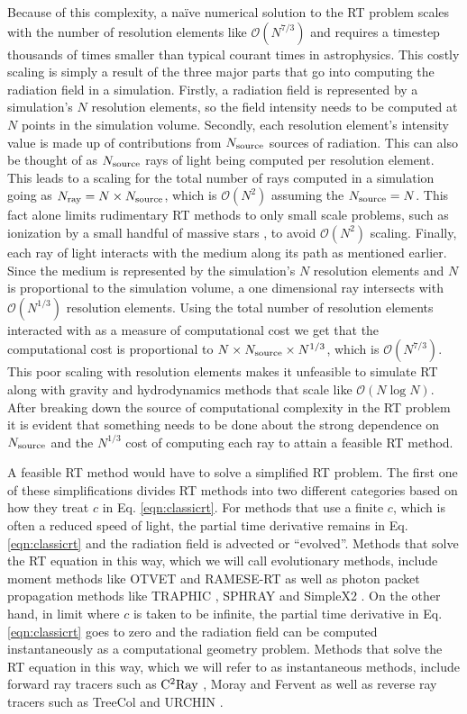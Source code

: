 \documentclass[fleq,usenatbib]{mnras}
\newcommand{\bigO}[1]{\mathcal{O}\left(#1\right)}
\newcommand{\NS}{N_{\rm source}}
\newcommand{\NR}{N_{\rm ray}}
\begin{document}
Because of this complexity, a na\"ive numerical solution to the RT problem 
scales with the number of resolution elements like $\bigO{N^{7/3}}$ and 
requires a timestep thousands of times smaller than typical courant times in 
astrophysics. This costly scaling is simply a result of the three major parts 
that go into computing the radiation field in a simulation. Firstly, a 
radiation field is represented by a simulation's $N$ resolution elements, so 
the field intensity needs to be computed at $N$ points in the simulation 
volume. Secondly, each resolution element's intensity value is made up of 
contributions from $\NS$ sources of radiation. This can also be thought of as 
$\NS$ rays of light being computed per resolution element. This leads to a 
scaling for the total number of rays computed in a simulation going as 
$\NR = N \times \NS$, which is $\bigO{N^2}$ assuming the $\NS = N$. This 
fact alone limits rudimentary RT methods to only small scale problems, such as 
ionization by a small handful of massive stars \citep{howard16, howard17}, to 
avoid $\bigO{N^2}$ scaling. Finally, each ray of light interacts with the 
medium along its path as mentioned earlier. Since the medium is represented by 
the simulation's $N$ resolution elements and $N$ is proportional to the 
simulation volume, a one dimensional ray intersects with $\bigO{N^{1/3}}$ 
resolution elements. Using the total number of resolution elements interacted 
with as a measure of computational cost we get that the computational cost is 
proportional to $N \times \NS \times N^{1/3}$, which is $\bigO{N^{7/3}}$. 
This poor scaling with resolution elements makes it unfeasible to simulate RT 
along with gravity and hydrodynamics methods that scale like $\bigO{N\log N}$. 
After breaking down the source of computational complexity in the RT problem 
it is evident that something needs to be done about the strong dependence on 
$\NS$ and the $N^{1/3}$ cost of computing each ray to attain a feasible RT 
method.

A feasible RT method would have to solve a simplified RT problem. The first 
one of these simplifications divides RT methods into two different categories 
based on how they treat $c$ in Eq. \ref{eqn:classicrt}. For methods that use a 
finite $c$, which is often a reduced speed of light, the partial time 
derivative remains in Eq. \ref{eqn:classicrt} and the radiation field 
is advected or ``evolved''. Methods that solve the RT equation in this way, 
which we will call evolutionary methods, include moment methods like OTVET 
\citep{gnedinAbel01} and  RAMESE-RT \citep{rosdahlTeyssier15} as well as 
photon packet propagation methods like TRAPHIC \citep{pawlikSchaye08}, SPHRAY 
\citep{altayEt08} and SimpleX2 \citep{paardekooperEt10}. On the other hand, in 
limit where $c$ is taken to be infinite, the partial time derivative in 
Eq. \ref{eqn:classicrt} goes to zero and the radiation field can be 
computed instantaneously as a computational geometry problem. Methods that 
solve the RT equation in this way, which we will refer to as instantaneous 
methods, include forward ray tracers such as $\rm C^2Ray$ 
\citep{mellemaEt06a}, Moray \citep{wiseAbel11} and Fervent 
\citep{baczynskiEt15} as well as reverse ray tracers such as TreeCol 
\citep{clarkEt12} and URCHIN \citep{altayTheuns13}. 
\end{document}
